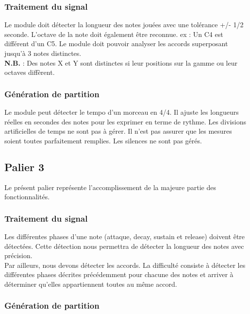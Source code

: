 \documentclass[12pt]{article}
\begin{document}
\subsubsection{Traitement du signal}

Le module doit détecter la longueur des notes jouées avec une tolérance +/- 1/2 seconde. L’octave de la note doit également être reconnue. ex : Un C4 est différent d’un C5. Le module doit pouvoir analyser les accords superposant jusqu’à 3 notes distinctes.\\

\textbf{N.B.} : Des notes X et Y sont distinctes si leur positions sur la gamme ou leur octaves diffèrent.

\subsubsection{Génération de partition}

Le module peut détecter le tempo d’un morceau en 4/4. Il ajuste les longueurs réelles en secondes des notes pour les exprimer en terme de rythme. Les divisions artificielles de temps ne sont pas à gérer. Il n’est pas assurer que les mesures soient toutes parfaitement remplies. Les silences ne sont pas gérés.

\newpage
\subsection{Palier 3}

Le présent palier représente l’accomplissement de la majeure partie des fonctionnalités.\\

\subsubsection{Traitement du signal}

Les différentes phases d’une note (attaque, decay, sustain et release) doivent être détectées. Cette détection nous permettra de détecter la longueur des notes avec précision.\\

Par ailleurs, nous devons détecter les accords. La difficulté consiste à détecter les différentes phases décrites précédemment pour chacune des notes et arriver à déterminer qu'elles appartiennent toutes au même accord.

\subsubsection{Génération de partition}
\end{document}
